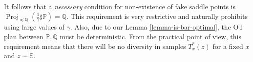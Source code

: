 \documentclass{article} %
\DeclareMathOperator{\Proj}{Proj}
\newtheorem{proposition}{Proposition}
\begin{document}
It follows that a \textit{necessary} condition for non-existence of fake saddle points is $\Proj_{\preceq\mathbb{Q}}(\frac{1}{\gamma}\sharp\mathbb{P})=\mathbb{Q}$.
This requirement is very restrictive and naturally prohibits using large values of $\gamma$. Also, due to our Lemma \ref{lemma-is-bar-optimal}, the OT plan between $\mathbb{P},\mathbb{Q}$ must be deterministic. From the practical point of view, this requirement means that there will be no diversity in samples $T_{x}^{*}(z)$ for a fixed $x$ and  $z\sim\mathbb{S}$.
\end{document}
